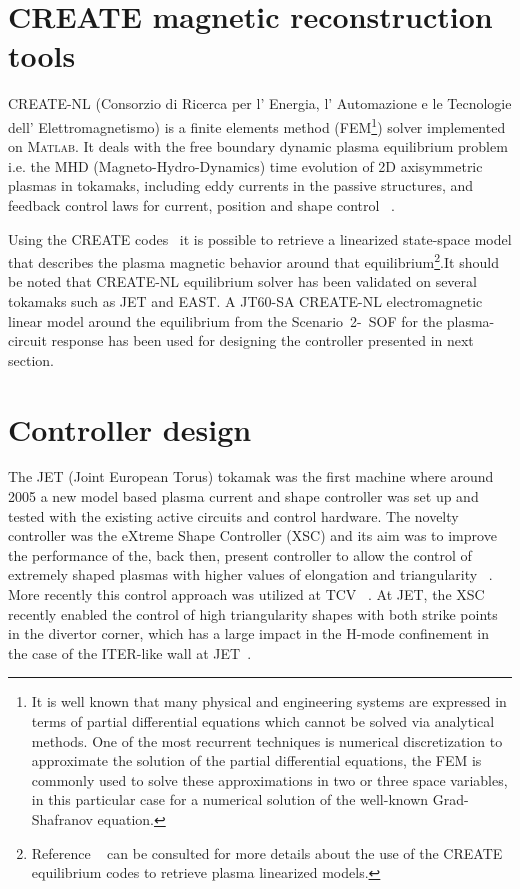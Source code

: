 \section{CREATE magnetic reconstruction tools}

CREATE-NL (Consorzio di Ricerca per l' Energia, l' Automazione e le Tecnologie dell' Elettromagnetismo) is a finite elements method (FEM\footnote{It is well known that many physical and engineering systems are expressed in terms of partial differential equations which cannot be solved via analytical methods. One of the most recurrent techniques is numerical discretization to approximate the solution of the partial differential equations, the FEM is commonly used to solve these approximations in two or three space variables, in this particular case for a numerical solution of the well-known Grad-Shafranov equation. }) solver implemented on \textsc{Matlab}. It deals with the free boundary dynamic plasma equilibrium problem i.e. the MHD (Magneto-Hydro-Dynamics) time evolution of 2D axisymmetric plasmas in tokamaks, including eddy currents in the passive structures, and feedback control laws for current, position and shape control ~\cite{Albanese:CREATENLnew}.
\smallskip

Using the CREATE codes~\cite{Albanese:CREATEL,Albanese:CREATENLnew} it is possible to retrieve a linearized state-space model that describes the plasma magnetic behavior around that equilibrium\footnote{Reference  ~\cite[Sec.~3]{NCruz} can be consulted for more details about the use of the CREATE equilibrium codes to retrieve plasma linearized models.}.It should be noted that CREATE-NL equilibrium solver has been validated on several tokamaks such as JET and EAST. A JT60-SA CREATE-NL electromagnetic linear model around the equilibrium from the Scenario~2-~SOF  for the plasma-circuit response has been used for  designing  the controller presented in next section.
\smallskip






\section{Controller design}

The JET (Joint European Torus) tokamak was the first machine where around 2005 a new model based plasma current and shape controller was set up and tested  with the existing active circuits and control hardware. The novelty controller was the eXtreme Shape Controller (XSC) and its aim was to improve  the performance of the, back then, present controller to allow the control of extremely shaped plasmas with higher values of elongation and triangularity ~\cite{Albanese2005}. More recently this control approach was utilized at TCV ~\cite{anand2017novel}. At JET, the XSC recently enabled the control of high triangularity shapes with both strike points in the divertor corner, which has a large impact in the H-mode confinement in the case of the ITER-like wall at JET~\cite{de2016recent}.   
 \smallskip
 

